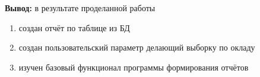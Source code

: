 \documentclass[pscyr, 12pt]{hedlab}
\begin{document}
    \noindent\textbf{Вывод:} в результате проделанной работы\vspace*{-0.5em}
    \begin{enumerate}\itemsep-5pt
        \item создан отчёт по таблице из БД
        \item создан пользовательский параметр делающий выборку по окладу
        \item изучен базовый функционал программы формирования отчётов
    \end{enumerate}
\end{document}
